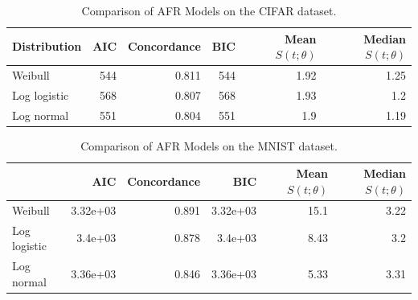 \begin{table}[!h]
\centering
\caption{Comparison of AFR Models on the CIFAR dataset.}
\label{tab:cifar}
\begin{tabular}{lrrrrr}
\toprule
Distribution &  AIC &  Concordance &  BIC &  Mean $S(t;\theta)$ &  Median $S(t;\theta)$ \\
\midrule
Weibull      &  544 &        0.811 &  544 &                1.92 &                  1.25 \\
Log logistic &  568 &        0.807 &  568 &                1.93 &                   1.2 \\
Log normal   &  551 &        0.804 &  551 &                 1.9 &                  1.19 \\
\bottomrule
\end{tabular}
\centering
\end{table}

\begin{table}[!h]
\centering
\caption{Comparison of AFR Models on the MNIST dataset.}
\label{tab:mnist}
\begin{tabular}{lrrrrr}
\toprule
{} &      AIC &  Concordance &      BIC &  Mean $S(t;\theta)$ &  Median $S(t;\theta)$ \\
\midrule
Weibull      & 3.32e+03 &        0.891 & 3.32e+03 &                15.1 &                  3.22 \\
Log logistic &  3.4e+03 &        0.878 &  3.4e+03 &                8.43 &                   3.2 \\
Log normal   & 3.36e+03 &        0.846 & 3.36e+03 &                5.33 &                  3.31 \\
\bottomrule
\end{tabular}
\end{table}

